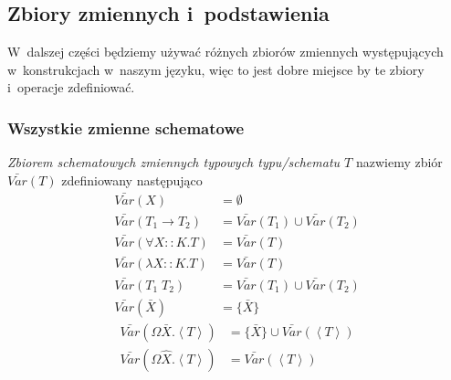 \documentclass[11pt,leqno]{article}
\begin{document}
\subsection{Zbiory zmiennych i~podstawienia}

W~dalszej części będziemy używać różnych zbiorów zmiennych występujących w~konstrukcjach w~naszym języku, więc
to jest dobre miejsce by te zbiory i~operacje zdefiniować.

\subsubsection{Wszystkie zmienne schematowe}

\begin{definicja}
\emph{Zbiorem schematowych zmiennych typowych typu/schematu $T$} nazwiemy zbiór $\bar{Var}(T)$ zdefiniowany następująco
\begin{align*}
\bar{Var}(X) & = \emptyset \\
\bar{Var}(T_1 \to T_2) & = \bar{Var}(T_1) \cup \bar{Var}(T_2) \\
\bar{Var}(\forall X :: K.T) & = \bar{Var}(T) \\
\bar{Var}(\lambda X :: K.T) & = \bar{Var}(T) \\
\bar{Var}(T_1 \; T_2) & = \bar{Var}(T_1) \cup \bar{Var}(T_2) \\
\bar{Var}(\bar{X}) & = \{ \bar{X} \}
\end{align*}
\begin{align*}
\bar{Var}(\Omega \bar{X}.\left<T\right>) & = \{ \bar{X} \} \cup \bar{Var}(\left<T\right>) \\
\bar{Var}(\Omega \widehat{X}.\left<T\right>) & = \bar{Var}(\left<T\right>)
\end{align*}
\end{definicja}
\end{document}
